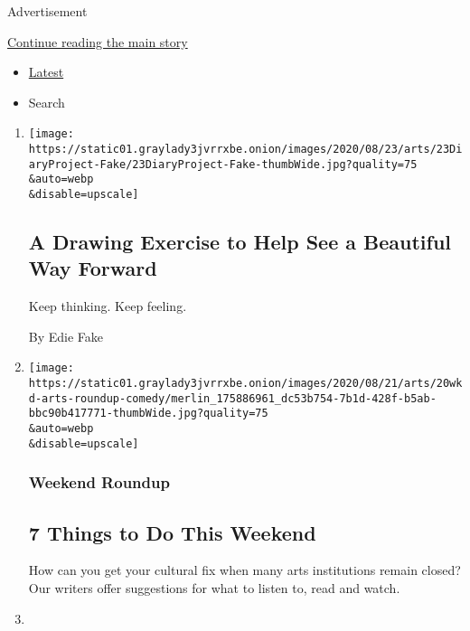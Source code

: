 Advertisement

\protect\hyperlink{after-mid1}{Continue reading the main story}

\begin{itemize}
\tightlist
\item
  \protect\hyperlink{stream-panel}{Latest}
\item
  Search
\end{itemize}

\begin{enumerate}
\def\labelenumi{\arabic{enumi}.}
\item
  \href{/2020/08/21/arts/drawing-flower-meditation.html}{}

  \texttt{[image: https://static01.graylady3jvrrxbe.onion/images/2020/08/23/arts/23DiaryProject-Fake/23DiaryProject-Fake-thumbWide.jpg?quality=75\\\&auto=webp\\\&disable=upscale]}

  \hypertarget{a-drawing-exercise-to-help-see-a-beautiful-way-forward}{%
  \subsection{A Drawing Exercise to Help See a Beautiful Way
  Forward}\label{a-drawing-exercise-to-help-see-a-beautiful-way-forward}}

  Keep thinking. Keep feeling.

  By Edie Fake
\item
  \href{/2020/08/20/arts/things-to-do-weekend-coronavirus.html}{}

  \texttt{[image: https://static01.graylady3jvrrxbe.onion/images/2020/08/21/arts/20wkd-arts-roundup-comedy/merlin\_175886961\_dc53b754-7b1d-428f-b5ab-bbc90b417771-thumbWide.jpg?quality=75\\\&auto=webp\\\&disable=upscale]}

  \hypertarget{weekend-roundup}{%
  \subsubsection{Weekend Roundup}\label{weekend-roundup}}

  \hypertarget{7-things-to-do-this-weekend}{%
  \subsection{7 Things to Do This
  Weekend}\label{7-things-to-do-this-weekend}}

  How can you get your cultural fix when many arts institutions remain
  closed? Our writers offer suggestions for what to listen to, read and
  watch.
\item
  \href{/2020/08/19/arts/design/brooklyn-museum-el-museo-del-barrio-reopening.html}{}


\end{enumerate}
